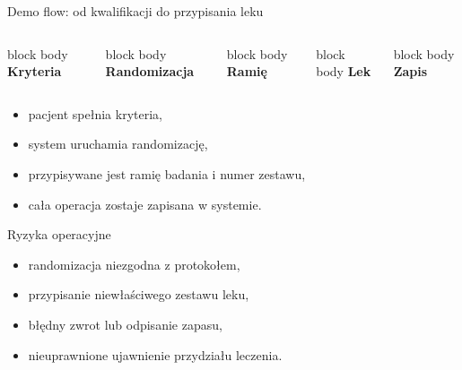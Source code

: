 \begin{frame}{Demo flow: od kwalifikacji do przypisania leku}
  \begin{columns}[T,onlytextwidth]
    \begin{beamercolorbox}[wd=\linewidth,sep=0.6em,rounded=true]{block body}
      \centering
      \textbf{Kryteria}
    \end{beamercolorbox}

    \begin{beamercolorbox}[wd=\linewidth,sep=0.6em,rounded=true]{block body}
      \centering
      \textbf{Randomizacja}
    \end{beamercolorbox}

    \begin{beamercolorbox}[wd=\linewidth,sep=0.6em,rounded=true]{block body}
      \centering
      \textbf{Ramię}
    \end{beamercolorbox}

    \begin{beamercolorbox}[wd=\linewidth,sep=0.6em,rounded=true]{block body}
      \centering
      \textbf{Lek}
    \end{beamercolorbox}

    \begin{beamercolorbox}[wd=\linewidth,sep=0.6em,rounded=true]{block body}
      \centering
      \textbf{Zapis}
    \end{beamercolorbox}
  \end{columns}

  \vspace{0.45cm}

  \begin{itemize}
    \item pacjent spełnia kryteria,
    \item system uruchamia randomizację,
    \item przypisywane jest ramię badania i numer zestawu,
    \item cała operacja zostaje zapisana w systemie.
  \end{itemize}
\end{frame}

\begin{frame}{Ryzyka operacyjne}
  \begin{itemize}
    \item randomizacja niezgodna z protokołem,
    \item przypisanie niewłaściwego zestawu leku,
    \item błędny zwrot lub odpisanie zapasu,
    \item nieuprawnione ujawnienie przydziału leczenia.
  \end{itemize}
\end{frame}


